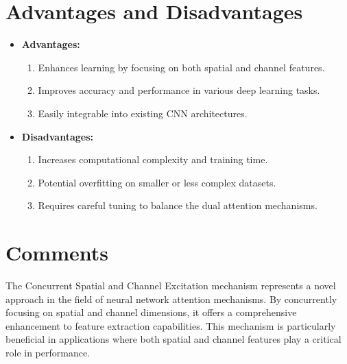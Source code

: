 \section{Advantages and Disadvantages}
\begin{itemize}
    \item \textbf{Advantages:}
    \begin{enumerate}
        \item Enhances learning by focusing on both spatial and channel features.
        \item Improves accuracy and performance in various deep learning tasks.
        \item Easily integrable into existing CNN architectures.
    \end{enumerate}
    \item \textbf{Disadvantages:}
    \begin{enumerate}
        \item Increases computational complexity and training time.
        \item Potential overfitting on smaller or less complex datasets.
        \item Requires careful tuning to balance the dual attention mechanisms.
    \end{enumerate}
\end{itemize}

\section{Comments}
The Concurrent Spatial and Channel Excitation mechanism represents a novel approach in the field of neural network attention mechanisms. By concurrently focusing on spatial and channel dimensions, it offers a comprehensive enhancement to feature extraction capabilities. This mechanism is particularly beneficial in applications where both spatial and channel features play a critical role in performance.
